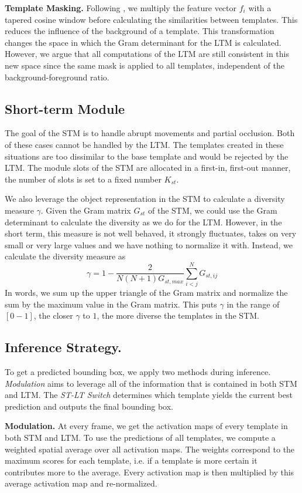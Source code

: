 \documentclass{article}
\begin{document}
\textbf{Template Masking.}
Following \cite{bolme2010visual}, we multiply the feature vector $f_i$ with a tapered cosine window before calculating the similarities between templates. This reduces the influence of the background of a template. This transformation changes the space in which the Gram determinant for the LTM is calculated. However, we argue that all computations of the LTM are still consistent in this new space since the same mask is applied to all templates, independent of the background-foreground ratio.



\subsection{Short-term Module}\label{sec:shorttermmodule}
The goal of the STM is to handle abrupt movements and partial occlusion. Both of these cases cannot be handled by the LTM. The templates created in these situations are too dissimilar to the base template and would be rejected by the LTM. The module slots of the STM are allocated in a first-in, first-out manner, the number of slots is set to a fixed number $K_{st}$.

We also leverage the object representation in the STM to calculate a diversity measure $\gamma$. Given the Gram matrix $G_{st}$ of the STM, we could use the Gram determinant to calculate the diversity as we do for the LTM. However, in the short term, this measure is not well behaved, it strongly fluctuates, takes on very small or very large values and we have nothing to normalize it with. Instead, we calculate the diversity measure as 
$$\gamma = 1 - \frac{2}{N(N+1)G_{st, max}} \sum^{N}_{i<j}{G_{st, ij}}$$ 
In words, we sum up the upper triangle of the Gram matrix and normalize the sum by the maximum value in the Gram matrix. This puts $\gamma$ in the range of $[0-1]$, the closer $\gamma$ to $1$, the more diverse the templates in the STM.

\subsection{Inference Strategy.} To get a predicted bounding box, we apply two methods during inference. \textit{Modulation} aims to leverage all of the information that is contained in both STM and LTM. The \textit{ST-LT Switch } determines which template yields the current best prediction and outputs the final bounding box.

\textbf{Modulation.} At every frame, we get the activation maps of every template in both STM and LTM. To use the predictions of all templates, we compute a weighted spatial average over all activation maps.  The weights correspond to the maximum scores for each template, i.e. if a template is more certain it contributes more to the average. Every activation map is then multiplied by this average activation map and re-normalized.
\end{document}
